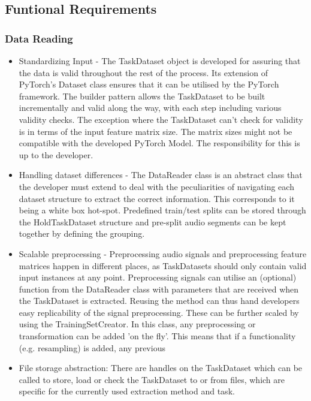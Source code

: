 \subsection{Funtional Requirements}
\subsubsection{Data Reading}
\begin{itemize}
	\item Standardizing Input - The TaskDataset object is developed for assuring that the data is valid throughout the rest of the process. Its extension of PyTorch's Dataset class ensures that it can be utilised by the PyTorch framework. The builder pattern allows the TaskDataset to be built incrementally and valid along the way, with each step including various validity checks.
	The exception where the TaskDataset can't check for validity is in terms of the input feature matrix size. The matrix sizes might not be compatible with the developed PyTorch Model. The responsibility for this is up to the developer.
	\item Handling dataset differences - The DataReader class is an abstract class that the developer must extend to deal with the peculiarities of navigating each dataset structure to extract the correct information. This corresponds to it being a white box hot-spot. Predefined train/test splits can be stored through the HoldTaskDataset structure and pre-split audio segments can be kept together by defining the grouping. 
	\item Scalable preprocessing - Preprocessing audio signals and preprocessing feature matrices happen in different places, as TaskDatasets should only contain valid input instances at any point. Preprocessing signals can utilise an (optional) function from the DataReader class with parameters that are received when the TaskDataset is extracted. Reusing the method can thus hand developers easy replicability of the signal preprocessing. These can be further scaled by using the TrainingSetCreator. In this class, any preprocessing or transformation can be added 'on the fly'. This means that if a functionality (e.g. resampling) is added, any previous 
	\item File storage abstraction: There are handles on the TaskDataset which can be called to store, load or check the TaskDataset to or from files, which are specific for the currently used extraction method and task.

\end{itemize}
